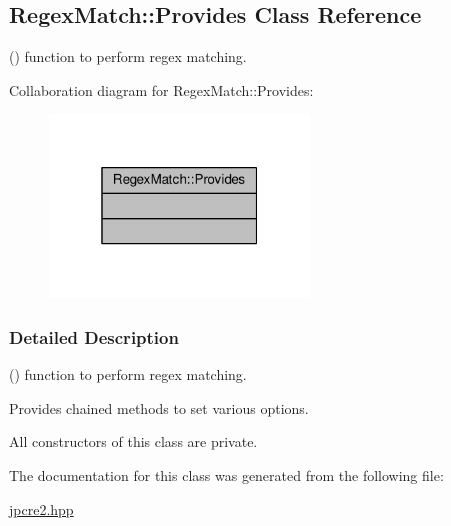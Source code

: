 \hypertarget{classRegexMatch_1_1Provides}{}\subsection{Regex\+Match\+:\+:Provides Class Reference}
\label{classRegexMatch_1_1Provides}


() function to perform regex matching.  




Collaboration diagram for Regex\+Match\+:\+:Provides\+:
\nopagebreak
\begin{figure}[H]
\begin{center}
\leavevmode
\includegraphics[width=196pt]{classRegexMatch_1_1Provides__coll__graph}
\end{center}
\end{figure}


\subsubsection{Detailed Description}
() function to perform regex matching. 

Provides chained methods to set various options.

All constructors of this class are private. 

The documentation for this class was generated from the following file\+:\begin{DoxyCompactItemize}
\item 
\hyperlink{jpcre2_8hpp}{jpcre2.\+hpp}\end{DoxyCompactItemize}
